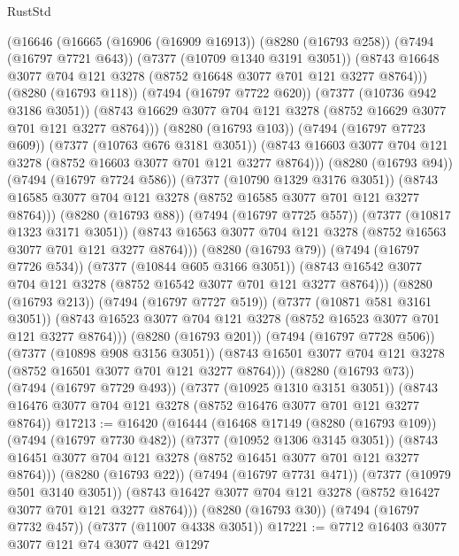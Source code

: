 \begin{lexlean}{RustStd}
\begin{coremodule}
                (@16646
                  (@16665
                    (@16906 (@16909 @16913))
                    (@8280 (@16793 @258))
                    (@7494 (@16797 @7721 @643))
                    (@7377 (@10709 @1340 @3191 @3051))
                    (@8743 @16648 @3077 @704 @121 @3278 (@8752 @16648 @3077 @701 @121 @3277 @8764)))
                  (@8280 (@16793 @118))
                  (@7494 (@16797 @7722 @620))
                  (@7377 (@10736 @942 @3186 @3051))
                  (@8743 @16629 @3077 @704 @121 @3278 (@8752 @16629 @3077 @701 @121 @3277 @8764)))
                (@8280 (@16793 @103))
                (@7494 (@16797 @7723 @609))
                (@7377 (@10763 @676 @3181 @3051))
                (@8743 @16603 @3077 @704 @121 @3278 (@8752 @16603 @3077 @701 @121 @3277 @8764)))
              (@8280 (@16793 @94))
              (@7494 (@16797 @7724 @586))
              (@7377 (@10790 @1329 @3176 @3051))
              (@8743 @16585 @3077 @704 @121 @3278 (@8752 @16585 @3077 @701 @121 @3277 @8764)))
            (@8280 (@16793 @88))
            (@7494 (@16797 @7725 @557))
            (@7377 (@10817 @1323 @3171 @3051))
            (@8743 @16563 @3077 @704 @121 @3278 (@8752 @16563 @3077 @701 @121 @3277 @8764)))
          (@8280 (@16793 @79))
          (@7494 (@16797 @7726 @534))
          (@7377 (@10844 @605 @3166 @3051))
          (@8743 @16542 @3077 @704 @121 @3278 (@8752 @16542 @3077 @701 @121 @3277 @8764)))
        (@8280 (@16793 @213))
        (@7494 (@16797 @7727 @519))
        (@7377 (@10871 @581 @3161 @3051))
        (@8743 @16523 @3077 @704 @121 @3278 (@8752 @16523 @3077 @701 @121 @3277 @8764)))
      (@8280 (@16793 @201))
      (@7494 (@16797 @7728 @506))
      (@7377 (@10898 @908 @3156 @3051))
      (@8743 @16501 @3077 @704 @121 @3278 (@8752 @16501 @3077 @701 @121 @3277 @8764)))
    (@8280 (@16793 @73))
    (@7494 (@16797 @7729 @493))
    (@7377 (@10925 @1310 @3151 @3051))
    (@8743 @16476 @3077 @704 @121 @3278 (@8752 @16476 @3077 @701 @121 @3277 @8764))
@17213 := @16420
    (@16444
      (@16468
        @17149
        (@8280 (@16793 @109))
        (@7494 (@16797 @7730 @482))
        (@7377 (@10952 @1306 @3145 @3051))
        (@8743 @16451 @3077 @704 @121 @3278 (@8752 @16451 @3077 @701 @121 @3277 @8764)))
      (@8280 (@16793 @22))
      (@7494 (@16797 @7731 @471))
      (@7377 (@10979 @501 @3140 @3051))
      (@8743 @16427 @3077 @704 @121 @3278 (@8752 @16427 @3077 @701 @121 @3277 @8764)))
    (@8280 (@16793 @30))
    (@7494 (@16797 @7732 @457))
    (@7377 (@11007 @4338 @3051))
@17221 := @7712 @16403 @3077 @3077 @121 @74 @3077 @421 @1297

\end{coremodule}
\end{lexlean}
